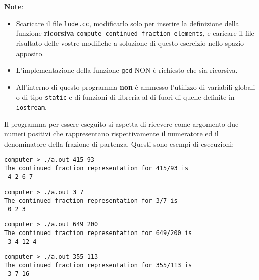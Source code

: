\documentclass[11pt,a4paper]{article}
\begin{document}
\noindent \textbf{Note}:
\begin{itemize}
\item Scaricare il file \verb|lode.cc|, modificarlo solo per inserire
  la definizione della funzione \textbf{ricorsiva}
  \texttt{compute\_continued\_fraction\_elements}, e caricare il file
  risultato delle vostre modifiche a soluzione di questo esercizio
  nello spazio apposito.
\item L'implementazione della funzione \texttt{gcd} NON
  è richiesto che sia ricorsiva.
\item All'interno di questo programma \textbf{non} è ammesso
  l'utilizzo di variabili globali o di tipo \texttt{static} e di
  funzioni di libreria al di fuori di quelle definite in
  \texttt{iostream}.
\end{itemize}

\noindent Il programma per essere eseguito si aspetta di ricevere come
argomento due numeri positivi che rappresentano rispettivamente il
numeratore ed il denominatore della frazione di partenza.
%
Questi sono esempi di esecuzioni:
\begin{verbatim}
computer > ./a.out 415 93
The continued fraction representation for 415/93 is
 4 2 6 7
\end{verbatim}
\begin{verbatim}
computer > ./a.out 3 7
The continued fraction representation for 3/7 is
 0 2 3
\end{verbatim}
\begin{verbatim}
computer > ./a.out 649 200
The continued fraction representation for 649/200 is
 3 4 12 4
\end{verbatim}
\begin{verbatim}
computer > ./a.out 355 113
The continued fraction representation for 355/113 is
 3 7 16
\end{verbatim}
\end{document}
